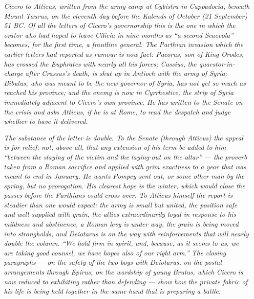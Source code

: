 
\textit{Cicero to Atticus, written from the army camp at Cybistra
in Cappadocia, beneath Mount Taurus, on the eleventh day before
the Kalends of October (21 September) 51 BC. Of all the letters
of Cicero's governorship this is the one in which the orator
who had hoped to leave Cilicia in nine months as ``a second
Scaevola'' becomes, for the first time, a frontline general.
The Parthian invasion which the earlier letters had reported as
rumour is now fact: Pacorus, son of King Orodes, has crossed
the Euphrates with nearly all his forces; Cassius, the
quaestor-in-charge after Crassus's death, is shut up in Antioch
with the army of Syria; Bibulus, who was meant to be the new
governor of Syria, has not yet so much as reached his province;
and the enemy is now in Cyrrhestice, the strip of Syria
immediately adjacent to Cicero's own province. He has written
to the Senate on the crisis and asks Atticus, if he is at
Rome, to read the despatch and judge whether to have it
delivered.}

\textit{The substance of the letter is double. To the Senate
(through Atticus) the appeal is for relief: not, above all,
that any extension of his term be added to him \textit{``between
the slaying of the victim and the laying-out on the altar''} ---
the proverb taken from a Roman sacrifice and applied with grim
exactness to a year that was meant to end in January. He wants
Pompey sent out, or some other man by the spring, but no
prorogation. His clearest hope is the winter, which would close
the passes before the Parthians could cross over. To Atticus
himself the report is steadier than one would expect: the army
is small but united, the position safe and well-supplied with
grain, the allies extraordinarily loyal in response to his
mildness and abstinence, a Roman levy is under way, the grain
is being moved into strongholds, and Deiotarus is on the way
with reinforcements that will nearly double the column. ``We
hold firm in spirit, and, because, as it seems to us, we are
taking good counsel, we have hopes also of our right arm.'' The
closing paragraphs --- on the safety of the two boys with
Deiotarus, on the postal arrangements through Epirus, on the
wardship of young Brutus, which Cicero is now reduced to
exhibiting rather than defending --- show how the private fabric
of his life is being held together in the same hand that is
preparing a battle.}
